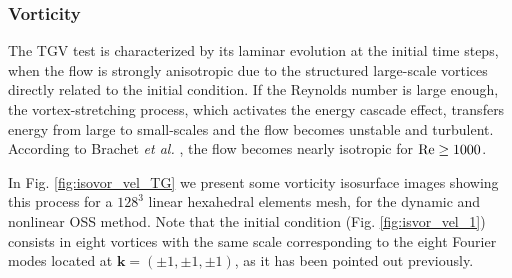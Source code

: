 \subsubsection{Vorticity}
The TGV test is characterized by its laminar evolution at the initial time steps, when the flow is strongly anisotropic due to the structured large-scale vortices directly related to the initial condition. If the Reynolds number is large enough, the vortex-stretching process, which activates the energy cascade effect, transfers energy from large to small-scales and the flow becomes unstable and turbulent. According to Brachet \emph{et al.} \cite{brachet_small-scale_1983}, the flow becomes nearly isotropic for ${\rm Re}\geq1000$.

In Fig. \ref{fig:isovor_vel_TG} we present some vorticity isosurface images showing this process for  a $128^3$ linear hexahedral elements mesh, for the dynamic and nonlinear OSS method. Note that the initial condition (Fig. \ref{fig:isvor_vel_1}) consists in eight vortices with the same scale corresponding to the eight Fourier modes located at $\mathbf{k}=(\pm1,\pm1,\pm1)$, as it has been pointed out previously.

